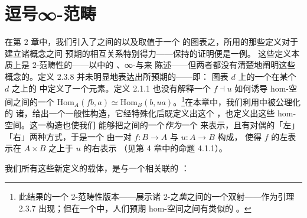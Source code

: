 \chapter{逗号∞-范畴}\label{ch:comma-infinity-categories}

\providecommand{\qcTwo}{\mathbf{2}}   %

在第 2 章中，我们引入了\trInfinityCategory{}之间的\trAdjunction{}以及取值于一个%
\trInfinityCategory{}的图表之\trLimit{}，所用的那些定义对于建立诸概念之间%
预期的相互关系特别得力——\trRightAdjoint{}保持\trLimit{}的证明便是一例。%
这些定义本质上是 2-范畴性的——以\trHomotopyTwoCategory{}中的%
\trInfinityCategory{}、∞-\trFunctor{}与\trInfinityNaturalTransformation{}来%
陈述——但两者都没有清楚地阐明这些概念的\trUniversalProperty。定义 2.3.8%
并未明显地表达出\trLimit\trCone{}所预期的\trUniversalProperty——即：%
图表 $d$ 上的一个\trLimit\trCone{}在某个 $d$ 之上的\trInfinityCategoryOfCones{}%
中定义了一个\trTerminal{}元素。定义 2.1.1 也没有解释一个\trAdjunction{}%
$f\dashv u$ 如何诱导 hom-空间之间的一个\trEquivalence{}%
$\mathrm{Hom}_A(fb,a)\simeq\mathrm{Hom}_B(b,ua)$。\footnote{此结果的一个%
2-范畴性版本——展示诸 2-\trCell{}之\emph{集}之间的一个双射——作为引理 2.3.7%
出现；但在一个\trInfinityCategory{}中，人们预期 hom-空间之间有类似的%
\trEquivalence{}。}在本章中，我们利用\trInfinityCosmos{}中被公理化的%
诸\trLimit{}，给出一个一般性构造，它经特殊化后既定义出这个%
\trInfinityCategoryOfCones{}，也定义出这些 hom-空间。这一构造也使我们%
能够把\trInfinityCategory{}之间的一个\trFunctor{}\emph{作为}一个%
\trInfinityCategory{}来表示，且有对偶的「左」「右」两种方式，于是一个%
\trAdjunction{}由一对\trFunctor{} $f\colon B\to A$ 与 $u\colon A\to B$ 构成，%
使得 $f$ 的左表示在 $A\times B$ 之上\trEquivalence{}于 $u$ 的右表示%
（见第 4 章中的命题 4.1.1）。

我们所有这些新定义的载体，是与一个\trCospan{}相关联的%
\emph{\trCommaInfinityCategory}：
\begin{center}
\end{center}

